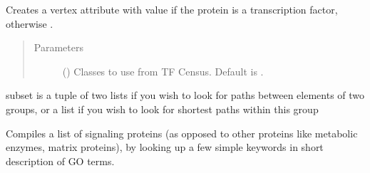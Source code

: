 \documentclass[letterpaper,10pt,english]{sphinxmanual}
\begin{document}
\begin{fulllineitems}
\begin{fulllineitems}
\end{fulllineitems}


\begin{fulllineitems}
\label{\detokenize{main:pypath.main.PyPath.set_tfs}}
\end{fulllineitems}


\begin{fulllineitems}
\label{\detokenize{main:pypath.main.PyPath.set_transcription_factors}}
Creates a vertex attribute  with value  if
the protein is a transcription factor, otherwise .
\begin{quote}\begin{description}
\item[{Parameters}] \leavevmode
{} () \textendash{} Classes to use from TF Census. Default is \sphinxtitleref{{[}‘a’, ‘b’, ‘other’{]}}.

\end{description}\end{quote}

\end{fulllineitems}


\begin{fulllineitems}
\label{\detokenize{main:pypath.main.PyPath.shortest_path_dist}}
subset is a tuple of two lists if you wish to look for
paths between elements of two groups, or a list if you
wish to look for shortest paths within this group

\end{fulllineitems}


\begin{fulllineitems}
\label{\detokenize{main:pypath.main.PyPath.signaling_proteins_list}}
Compiles a list of signaling proteins (as opposed to other proteins
like metabolic enzymes, matrix proteins), by looking up a few simple
keywords in short description of GO terms.


\end{fulllineitems}
\end{fulllineitems}
\end{document}
